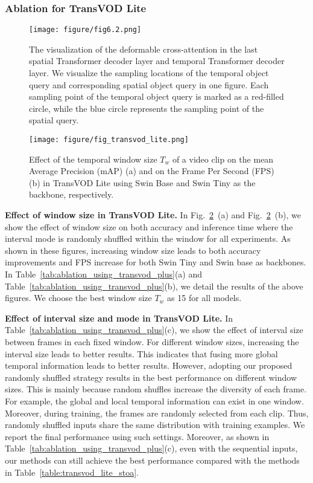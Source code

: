\documentclass[10pt,journal,compsoc]{IEEEtran}
\begin{document}
\subsubsection{Ablation for TransVOD Lite}
\label{sec:ablation_transvod_lite}

\begin{figure}[t!]
    \texttt{[image: figure/fig6.2.png]} 
    \caption{\small The visualization of the deformable cross-attention in the last spatial Transformer decoder layer and temporal Transformer decoder layer. We visualize the sampling locations of the temporal object query and corresponding spatial object query in one figure. Each sampling point of the temporal object query is marked as a red-filled circle, while the blue circle represents the sampling point of the spatial query.}
    \label{fig:sample_vis_res}
\end{figure}

\begin{figure}[t!]
    \centering
    \texttt{[image: figure/fig\_transvod\_lite.png]} 
    \caption{\small Effect of the temporal window size $T_w$ of a video clip on the mean Average Precision (mAP) (a) and on the Frame Per Second (FPS) (b) in TransVOD Lite using Swin Base and Swin Tiny as the backbone, respectively. }
    \label{fig:transvod_lite}
    \vspace{-5mm}
\end{figure}

\noindent
\textbf{Effect of window size in TransVOD Lite.} In Fig.~\ref{fig:transvod_lite}~(a) and Fig.~\ref{fig:transvod_lite}~(b), we show the effect of window size on both accuracy and inference time where the interval mode is randomly shuffled within the window for all experiments. As shown in these figures, increasing window size leads to both accuracy improvements and FPS increase for both Swin Tiny and Swin base as backbones. In Table~\ref{tab:ablation_using_transvod_plus}(a) and Table~\ref{tab:ablation_using_transvod_plus}(b), we detail the results of the above figures. We choose the best window size $T_{w}$ as 15 for all models.




\noindent
\textbf{Effect of interval size and mode in TransVOD Lite.} 
In Table~\ref{tab:ablation_using_transvod_plus}(c), we show the effect of interval size between frames in each fixed window. For different window sizes, increasing the interval size leads to better results. This indicates that fusing more global temporal information leads to better results. However, adopting our proposed randomly shuffled strategy results in the best performance on different window sizes. This is mainly because random shuffles increase the diversity of each frame. For example, the global and local temporal information can exist in one window. Moreover, during training, the frames are randomly selected from each clip. Thus, randomly shuffled inputs share the same distribution with training examples. We report the final performance using such settings. Moreover, as shown in Table~\ref{tab:ablation_using_transvod_plus}(c), even with the sequential inputs, our methods can still achieve the best performance compared with the methods in Table~\ref{table:transvod_lite_stoa}.
\end{document}
